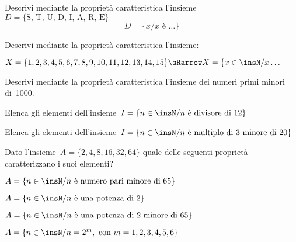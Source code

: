 
\begin{esercizio}
\label{ese:6.6}
Descrivi mediante la proprietà caratteristica
l'insieme~\(D= \{\text{S, T, U, D, I, A, R, E}\}\)
\[D=\{x/ x\text{ è }\ldots\}\]
\end{esercizio}


\begin{esercizio}
\label{ese:6.7}
Descrivi mediante la proprietà caratteristica l'insieme:

\(X=\{1, 2, 3, 4, 5, 6, 7, 8, 9, 10, 11, 12, 13, 14, 15\} \sRarrow
X=\{x\in\insN/x\ldots\)
\end{esercizio}

\begin{esercizio}
\label{ese:6.8}
Descrivi mediante la proprietà caratteristica l'insieme dei numeri primi minori 
di~1000.
\end{esercizio}

\begin{esercizio}
\label{ese:6.9}
Elenca gli elementi dell'insieme~\(I=\{n\in\insN/n\text{ è divisore di }12\}\)
\end{esercizio}

\begin{esercizio}
\label{ese:6.10}
Elenca gli elementi dell'insieme~\(I=\{n\in\insN/n\text{ è multiplo di~3 minore 
di }20\}\)
\end{esercizio}

\begin{esercizio}
\label{ese:6.11}
Dato l'insieme~\(A=\{2, 4, 8, 16, 32, 64\}\) quale delle seguenti proprietà 
caratterizzano i suoi elementi?
\begin{enumeratea}
\item \(A=\{n\in\insN/n \text{ è numero pari minore di }65\}\)
\item \(A=\{n\in\insN/n\text{ è una potenza di }2\}\)
\item \(A=\{n\in\insN/n\text{ è una potenza di~2 minore di }65\}\)
\item \(A=\{n\in\insN/n=2^{m},\text{ con }m=1,2,3,4,5,6\}\)
\end{enumeratea}
\end{esercizio}

